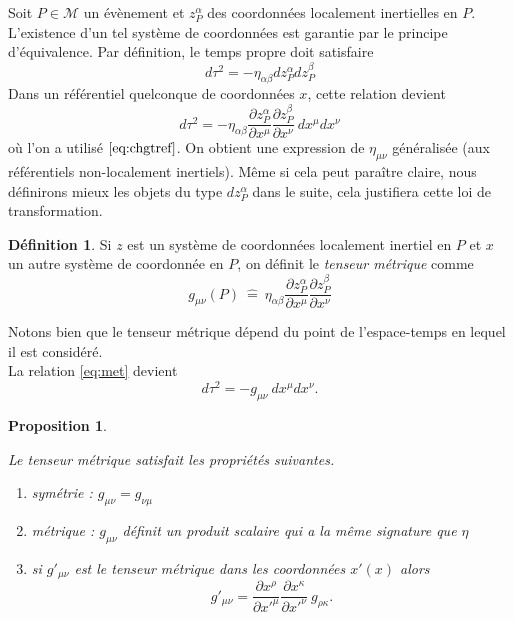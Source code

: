 \documentclass[a4paper,11pt]{report}
\theoremstyle{definition}
\theoremstyle{plain}
\newtheorem{prop}[thm]{Proposition}
\theoremstyle{definition}
\newtheorem{defn}{Définition}[chapter]
\theoremstyle{remark}
\newcommand{\M}{\mathscr{M}}
\newcommand{\p}{\partial}
\begin{document}
            Soit $P\in\M$ un évènement et $z^\alpha_P$ des coordonnées localement inertielles en $P$. L'existence d'un tel système de coordonnées est garantie par le principe d'équivalence. Par définition, le temps propre doit satisfaire
            \begin{equation}
                d\tau^2 = -\eta_{\alpha\beta}dz^\alpha_Pdz^\beta_P
            \end{equation}
            Dans un référentiel quelconque de coordonnées $x$, cette relation devient
            \begin{equation}\label{eq:met}
                d\tau^2 = -\eta_{\alpha\beta}\frac{\p z^\alpha_P}{\p x^\mu}\frac{\p z^\beta_P}{\p x^\nu}~dx^\mu dx^\nu
            \end{equation}
            où l'on a utilisé $\ref{eq:chgtref}$. On obtient une expression de $\eta_{\mu\nu}$ généralisée (aux référentiels non-localement inertiels). Même si cela peut paraître claire, nous définirons mieux les objets du type $dz^\alpha_P$ dans le suite, cela justifiera cette loi de transformation.
            
            \begin{defn}
                Si $z$ est un système de coordonnées localement inertiel en $P$ et $x$ un autre système de coordonnée en $P$, on définit le \textit{tenseur métrique} comme
                \begin{equation}
                    g_{\mu\nu}(P)~\hat{=}~\eta_{\alpha\beta}\frac{\p z^\alpha_P}{ \p x^\mu}\frac{\p z^\beta_P}{\p x^\nu}
                \end{equation}
            \end{defn}
            Notons bien que le tenseur métrique dépend du point de l'espace-temps en lequel il est considéré.\\
            La relation \ref{eq:met} devient
            \begin{equation}
                d\tau^2 = -g_{\mu\nu}~dx^\mu dx^\nu.
            \end{equation}
            
            \begin{prop}\begin{leftbar}
                Le tenseur métrique satisfait les propriétés suivantes.
                \begin{enumerate}[label = \textit{\roman*)}]
                    \item symétrie : $g_{\mu\nu}=g_{\nu\mu}$
                    \item métrique : $g_{\mu\nu}$ définit un produit scalaire qui a la même signature que $\eta$
                    \item si $g'_{\mu\nu}$ est le tenseur métrique dans les coordonnées $x'(x)$ alors
                    \begin{equation}
                        g'_{\mu\nu} = \frac{\p x^\rho}{\p x'^\mu}\frac{\p x^\kappa}{\p x'^\nu}~g_{\rho\kappa}.
                    \end{equation}
                \end{enumerate}
            \end{leftbar}\end{prop}
            
\end{document}
